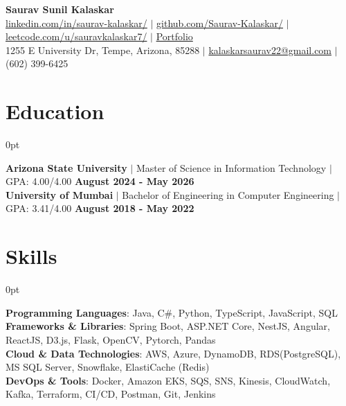 \documentclass[letterpaper,10pt]{article}
\newlength{\contentindent}
\newcommand{\sectioncontent}[1]{%
  \begin{adjustwidth}{\contentindent}{0pt}%
  #1%
  \end{adjustwidth}%
}
\begin{document}
\setlength{\parindent}{0pt}
\setlength{\parskip}{0pt}
\setlength{\rightskip}{0.25em}

\begin{center}
    {\Huge \textbf{Saurav Sunil Kalaskar}}\\[2pt]

    \href{http://www.linkedin.com/in/saurav-kalaskar}{linkedin.com/in/saurav-kalaskar/} $|$
    \href{https://github.com/Saurav-Kalaskar}{github.com/Saurav-Kalaskar/} $|$
    \href{https://leetcode.com/u/sauravkalaskar7/}{leetcode.com/u/sauravkalaskar7/} $|$
    \href{https://www.saurav-kalaskar.me/}{Portfolio}
    \\
    1255 E University Dr, Tempe, Arizona, 85288 $|$ \href{mailto:sauravkalaskar7@gmail.com}{kalaskarsaurav22@gmail.com} $|$ (602) 399-6425
\end{center}

\section{Education}
\sectioncontent{
\textbf{Arizona State University} $|$ Master of Science in Information Technology $|$ GPA: 4.00/4.00 \hfill \textbf{August 2024 - May 2026}
\\[2pt]
\textbf{University of Mumbai} $|$ Bachelor of Engineering in Computer Engineering $|$ GPA: 3.41/4.00 \hfill \textbf{August 2018 - May 2022}
\\[2pt]
}

\section{Skills}
\sectioncontent{
\textbf{Programming Languages}: Java, C\#, Python, TypeScript, JavaScript, SQL\\
\textbf{Frameworks \& Libraries}: Spring Boot, ASP.NET Core, NestJS, Angular, ReactJS, D3.js, Flask, OpenCV, Pytorch, Pandas\\
\textbf{Cloud \& Data Technologies}: AWS, Azure, DynamoDB, RDS(PostgreSQL), MS SQL Server, Snowflake, ElastiCache (Redis)\\
\textbf{DevOps \& Tools}: Docker, Amazon EKS, SQS, SNS, Kinesis, CloudWatch, Kafka, Terraform, CI/CD, Postman, Git, Jenkins
}
\end{document}
